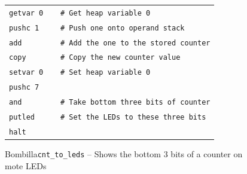 \documentclass[10pt]{article}
\newcommand{\bomb}{Bombilla\xspace}
\begin{document}
\begin{figure}
\begin{center}
\scriptsize
\begin{tabular}{l}
\verb;getvar 0    # Get heap variable 0;\\
\verb;pushc 1     # Push one onto operand stack;\\
\verb;add         # Add the one to the stored counter;\\     
\verb;copy        # Copy the new counter value;\\
\verb;setvar 0    # Set heap variable 0;\\
\verb;pushc 7 ;\\     
\verb;and         # Take bottom three bits of counter;\\
\verb;putled      # Set the LEDs to these three bits;\\
\verb;halt;\\
\end{tabular}
\normalsize


\caption{\bomb {\tt cnt\_to\_leds} -- Shows the bottom 3 bits of a counter on mote LEDs}

\label{fig:cnt}
\end{center}
\end{figure}
\end{document}
